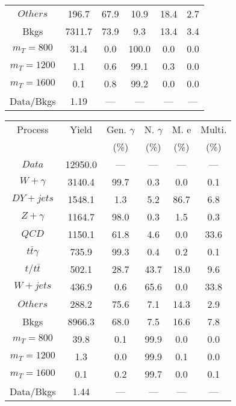 \begin{figure}
\begin{minipage}[c]{0.32\textwidth}
{\begin{tabular}{cccccc}
$ Others $ &  196.7 &  67.9 &  10.9 &  18.4 &  2.7\\
Bkgs &  7311.7 &  73.9 &  9.3 &  13.4 &  3.4\\
$ m_{T} = 800 $ &  31.4 &  0.0 &  100.0 &  0.0 &  0.0\\
$ m_{T} = 1200 $ &  1.1 &  0.6 &  99.1 &  0.3 &  0.0\\
$ m_{T} = 1600 $ &  0.1 &  0.8 &  99.2 &  0.0 &  0.0\\
Data/Bkgs &  1.19 &  --- &  --- &  --- &  ---\\
\hline
\end{tabular}
}
\end{minipage}
\begin{minipage}[c]{0.32\textwidth}
\centering
\tiny{
\begin{tabular}{cccccc}
\hline
Process & Yield & Gen. $\gamma$ & N. $\gamma$ & M. e & Multi. \\
 &  & (\%) & (\%) & (\%) & (\%)  \\
\hline
                                                                      $ Data $ &  12950.0 &  --- &  --- &  --- &  ---\\
$ W+\gamma $ &  3140.4 &  99.7 &  0.3 &  0.0 &  0.1\\
$ DY+jets $ &  1548.1 &  1.3 &  5.2 &  86.7 &  6.8\\
$ Z+\gamma $ &  1164.7 &  98.0 &  0.3 &  1.5 &  0.3\\
$ QCD $ &  1150.1 &  61.8 &  4.6 &  0.0 &  33.6\\
$ t\bar{t}\gamma $ &  735.9 &  99.3 &  0.4 &  0.2 &  0.1\\
$ t/t\bar{t} $ &  502.1 &  28.7 &  43.7 &  18.0 &  9.6\\
$ W+jets $ &  436.9 &  0.6 &  65.6 &  0.0 &  33.8\\
$ Others $ &  288.2 &  75.6 &  7.1 &  14.3 &  2.9\\
Bkgs &  8966.3 &  68.0 &  7.5 &  16.6 &  7.8\\
$ m_{T} = 800 $ &  39.8 &  0.1 &  99.9 &  0.0 &  0.0\\
$ m_{T} = 1200 $ &  1.3 &  0.0 &  99.9 &  0.1 &  0.0\\
$ m_{T} = 1600 $ &  0.1 &  0.2 &  99.7 &  0.0 &  0.1\\
Data/Bkgs &  1.44 &  --- &  --- &  --- &  ---\\
\hline
\end{tabular}
}
\end{minipage}
\begin{minipage}[c]{0.32\textwidth}
\centering

\end{minipage}
\end{figure}
